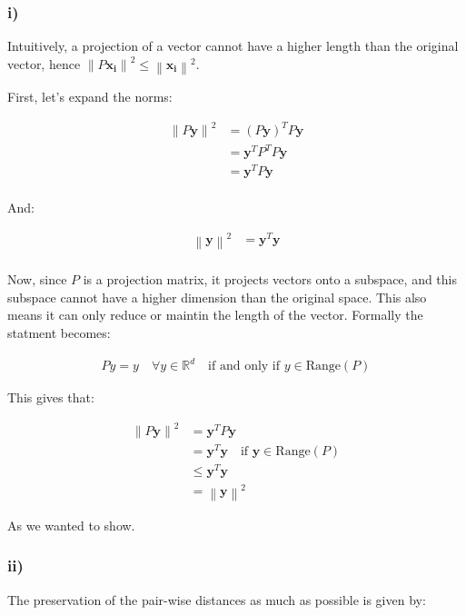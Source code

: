 \documentclass[12pt,a4paper,oneside]{paper}
\begin{document}
\subsubsection*{i)}

Intuitively, a projection of a vector cannot have a higher length than the original vector, hence $\left\| P \bm{x_i} \right\|^2 \leq \left\| \bm{x_i} \right\|^2$.

First, let's expand the norms:

\begin{align*}
    \left\| P \bm{y} \right\|^2 &= \left( P \bm{y} \right)^T P \bm{y} \\
    &= \bm{y}^T P^T P \bm{y} \\
    &= \bm{y}^T P \bm{y} \\
\end{align*}

And: 

\begin{align*}
    \left\| \bm{y} \right\|^2 &= \bm{y}^T \bm{y} \\
\end{align*}

Now, since $P$ is a projection matrix, it projects vectors onto a subspace, and this subspace cannot
have a higher dimension than the original space. This also means it can only reduce or maintin the length of the vector.
Formally the statment becomes: 

\begin{align*}
    Py = y \quad \forall y \in \mathbb{R}^d \quad \text{if and only if } y \in \text{Range}(P)
\end{align*}

This gives that: 

\begin{align*}
    \left\| P \bm{y} \right\|^2 &= \bm{y}^T P \bm{y} \\
    &= \bm{y}^T \bm{y} \quad \text{if } \bm{y} \in \text{Range}(P) \\
    &\leq \bm{y}^T \bm{y} \\
    &= \left\| \bm{y} \right\|^2
\end{align*}

As we wanted to show.

\subsubsection*{ii)}

The preservation of the pair-wise distances as much as possible is given by:
\end{document}
